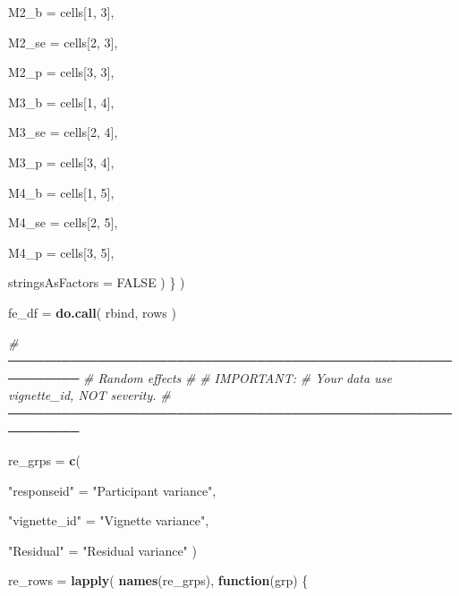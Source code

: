 \documentclass[
]{article}
\newenvironment{Shaded}{\begin{snugshade}}{\end{snugshade}}
\newcommand{\AttributeTok}[1]{\textcolor[rgb]{0.13,0.29,0.53}{#1}}
\newcommand{\CommentTok}[1]{\textcolor[rgb]{0.56,0.35,0.01}{\textit{#1}}}
\newcommand{\ConstantTok}[1]{\textcolor[rgb]{0.56,0.35,0.01}{#1}}
\newcommand{\ControlFlowTok}[1]{\textcolor[rgb]{0.13,0.29,0.53}{\textbf{#1}}}
\newcommand{\DecValTok}[1]{\textcolor[rgb]{0.00,0.00,0.81}{#1}}
\newcommand{\FunctionTok}[1]{\textcolor[rgb]{0.13,0.29,0.53}{\textbf{#1}}}
\newcommand{\NormalTok}[1]{#1}
\newcommand{\OtherTok}[1]{\textcolor[rgb]{0.56,0.35,0.01}{#1}}
\newcommand{\StringTok}[1]{\textcolor[rgb]{0.31,0.60,0.02}{#1}}
\begin{document}
\begin{Shaded}
\begin{Highlighting}[]
        \AttributeTok{M2\_b =}
\NormalTok{          cells[}\DecValTok{1}\NormalTok{, }\DecValTok{3}\NormalTok{],}

        \AttributeTok{M2\_se =}
\NormalTok{          cells[}\DecValTok{2}\NormalTok{, }\DecValTok{3}\NormalTok{],}

        \AttributeTok{M2\_p =}
\NormalTok{          cells[}\DecValTok{3}\NormalTok{, }\DecValTok{3}\NormalTok{],}

        \AttributeTok{M3\_b =}
\NormalTok{          cells[}\DecValTok{1}\NormalTok{, }\DecValTok{4}\NormalTok{],}

        \AttributeTok{M3\_se =}
\NormalTok{          cells[}\DecValTok{2}\NormalTok{, }\DecValTok{4}\NormalTok{],}

        \AttributeTok{M3\_p =}
\NormalTok{          cells[}\DecValTok{3}\NormalTok{, }\DecValTok{4}\NormalTok{],}

        \AttributeTok{M4\_b =}
\NormalTok{          cells[}\DecValTok{1}\NormalTok{, }\DecValTok{5}\NormalTok{],}

        \AttributeTok{M4\_se =}
\NormalTok{          cells[}\DecValTok{2}\NormalTok{, }\DecValTok{5}\NormalTok{],}

        \AttributeTok{M4\_p =}
\NormalTok{          cells[}\DecValTok{3}\NormalTok{, }\DecValTok{5}\NormalTok{],}

        \AttributeTok{stringsAsFactors =} \ConstantTok{FALSE}
\NormalTok{      )}
\NormalTok{    \}}
\NormalTok{  )}


\NormalTok{  fe\_df }\OtherTok{=}
    \FunctionTok{do.call}\NormalTok{(}
\NormalTok{      rbind,}
\NormalTok{      rows}
\NormalTok{    )}


  \CommentTok{\# ──────────────────────────────────────────────────────────}
  \CommentTok{\# Random effects}
  \CommentTok{\#}
  \CommentTok{\# IMPORTANT:}
  \CommentTok{\# Your data use vignette\_id, NOT severity.}
  \CommentTok{\# ──────────────────────────────────────────────────────────}

\NormalTok{  re\_grps }\OtherTok{=} \FunctionTok{c}\NormalTok{(}

    \StringTok{"responseid"} \OtherTok{=}
      \StringTok{"Participant variance"}\NormalTok{,}

    \StringTok{"vignette\_id"} \OtherTok{=}
      \StringTok{"Vignette variance"}\NormalTok{,}

    \StringTok{"Residual"} \OtherTok{=}
      \StringTok{"Residual variance"}
\NormalTok{  )}


\NormalTok{  re\_rows }\OtherTok{=}
    \FunctionTok{lapply}\NormalTok{(}
      \FunctionTok{names}\NormalTok{(re\_grps),}
      \ControlFlowTok{function}\NormalTok{(grp) \{}


\end{Highlighting}
\end{Shaded}
\end{document}

